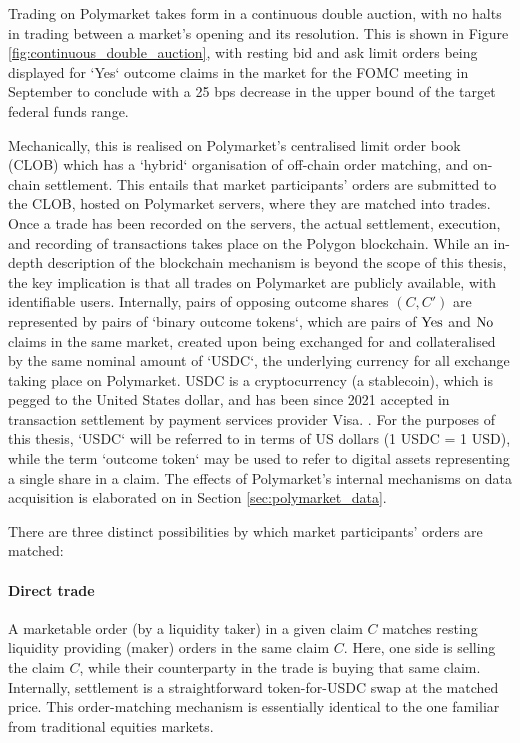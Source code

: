 Trading on Polymarket takes form in a continuous double auction, with no halts in trading between a market's opening and its resolution.
This is shown in Figure \ref{fig:continuous_double_auction}, with resting bid and ask limit orders being displayed for `Yes` outcome claims in the market for the FOMC meeting in September to conclude with a 25 bps decrease in the upper bound of the target federal funds range.

Mechanically, this is realised on Polymarket's centralised limit order book (CLOB) which has a `hybrid` organisation of off-chain order matching, and on-chain settlement.
This entails that market participants' orders are submitted to the CLOB, hosted on Polymarket servers, where they are matched into trades. Once a trade has been recorded on the servers, the actual settlement, execution, and recording of transactions takes place on the Polygon blockchain.
While an in-depth description of the blockchain mechanism is beyond the scope of this thesis, the key implication is that all trades on Polymarket are publicly available, with identifiable users.
Internally, pairs of opposing outcome shares $(C, C')$ are represented by pairs of `binary outcome tokens`, which are pairs of $\text{Yes}$ and $\text{No}$ claims in the same market, created upon being exchanged for and collateralised by the same nominal amount of `USDC`, the underlying currency for all exchange taking place on Polymarket.
USDC is a cryptocurrency (a stablecoin), which is pegged to the United States dollar, and has been since 2021 accepted in transaction settlement by payment services provider Visa. \parencite{hussain_visa_2021}.
For the purposes of this thesis, `USDC` will be referred to in terms of US dollars (1 USDC = 1 USD), while the term `outcome token` may be used to refer to digital assets representing a single share in a claim.
The effects of Polymarket's internal mechanisms on data acquisition is elaborated on in Section \ref{sec:polymarket_data}.

There are three distinct possibilities by which market participants' orders are matched:

\paragraph{Direct trade} A marketable order (by a liquidity taker) in a given claim $C$ matches resting liquidity providing (maker) orders in the same claim $C$. Here, one side is selling the claim $C$, while their counterparty in the trade is buying that same claim.
Internally, settlement is a straightforward token-for-USDC swap at the matched price.
This order-matching mechanism is essentially identical to the one familiar from traditional equities markets.


